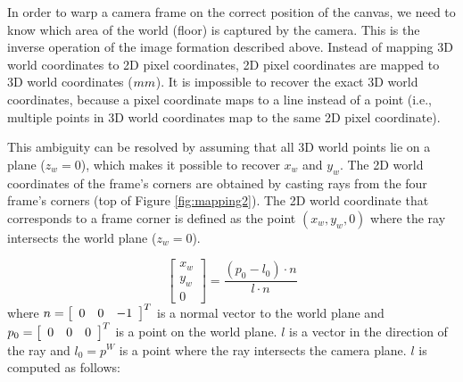 In order to warp a camera frame on the correct position of the canvas, we need to know which area of the world (floor) is captured by the camera.
This is the inverse operation of the image formation described above.
Instead of mapping 3D world coordinates to 2D pixel coordinates, 2D pixel coordinates are mapped to 3D world coordinates ($\small{mm}$).
It is impossible to recover the exact 3D world coordinates, because a pixel coordinate maps to a line instead of a point (i.e., multiple points in 3D world coordinates map to the same 2D pixel coordinate).

This ambiguity can be resolved by assuming that all 3D world points lie on a plane ($z_w = 0$), which makes it possible to recover $x_w$ and $y_w$.
The 2D world coordinates of the frame's corners are obtained by casting rays from the four frame's corners (top of Figure \ref{fig:mapping2}).
The 2D world coordinate that corresponds to a frame corner is defined as the point $(x_w,  y_w , 0)$ where the ray intersects the world plane ($z_w = 0$).

\begin{equation}
\left[ {
\begin{array}{c} x_w \\ y_w \\ 0 \end{array}
} \right]
 = \frac{(p_0 - l_0) \cdot n}{l \cdot n}
\end{equation}
where $n = \left[ {  \begin{array}{l l l} 0 & 0 & -1 \end{array}  } \right]^T$ is a normal vector to the world plane and $p_0 = \left[ {  \begin{array}{l l l} 0 & 0 & 0 \end{array}  } \right]^T$ is a point on the world plane.
$l$ is a vector in the direction of the ray and $l_0 = p^W$ is a point where the ray intersects the camera plane.
$l$ is computed as follows:

